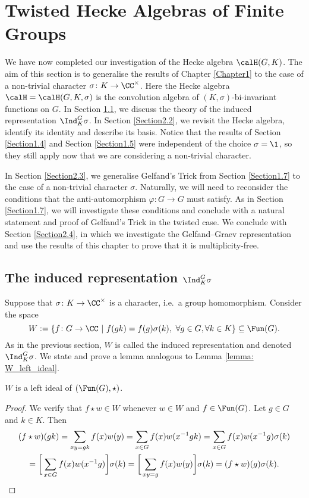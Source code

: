 \section{Twisted Hecke Algebras of Finite Groups}\label{Chapter2}
We have now completed our investigation of the Hecke algebra $\calH(G,K)$.
The aim of this section is to generalise the results of Chapter \ref{Chapter1} to the case of a non-trivial character $\sigma\colon K\to\CC^\times$.
Here the Hecke algebra $\calH=\calH(G,K,\sigma)$ is the convolution algebra of $(K,\sigma)$-bi-invariant functions on $G$.
In Section \ref{Section2.1}, we discuss the theory of the induced representation $\Ind_K^G \sigma$.
In Section \ref{Section2.2}, we revisit the Hecke algebra, identify its identity and describe its basis.
Notice that the results of Section \ref{Section1.4} and Section \ref{Section1.5} were independent of the choice $\sigma=\1$, so they still apply now that we are considering a non-trivial character.

In Section \ref{Section2.3}, we generalise Gelfand's Trick from Section \ref{Section1.7} to the case of a non-trivial character $\sigma$.
Naturally, we will need to reconsider the conditions that the anti-automorphism $\varphi\colon G\to G$ must satisfy.
As in Section \ref{Section1.7}, we will investigate these conditions and conclude with a natural statement and proof of Gelfand's Trick in the twisted case.
We conclude with Section \ref{Section2.4}, in which we investigate the Gelfand--Graev representation and use the results of this chapter to prove that it is multiplicity-free.


\subsection{The induced representation $\Ind_K^G \sigma$}\label{Section2.1}
Suppose that $\sigma\colon K \to\CC^\times$ is a character, i.e.\ a group homomorphism.
Consider the space
\[
	W := \{f\colon G\to \CC\ |\ f(gk) = f(g)\sigma(k),\ \forall g\in G, \forall k \in K\} \subseteq \Fun(G).
\]
As in the previous section, $W$ is called the induced representation and denoted $\Ind_K^G \sigma$.
We state and prove a lemma analogous to Lemma \ref{lemma: W_left_ideal}.
\begin{lem}\label{lemma: W_left_ideal_two}
	$W$ is a left ideal of $(\Fun(G),\star)$.
\end{lem}
\begin{proof}
	We verify that $f\star w\in W$ whenever $w\in W$ and $f\in\Fun(G)$.
	Let $g\in G$ and $k\in K$.
	Then
	\begin{multline*}
		(f\star w)(gk) = \sum_{xy=gk} f(x)w(y) = \sum_{x\in G} f(x)w(x^{-1}gk) = \sum_{x\in G} f(x)w(x^{-1}g)\sigma(k) \\
		= \bigg[\sum_{x\in G} f(x)w(x^{-1}g)\bigg]\sigma(k) = \bigg[\sum_{xy=g} f(x)w(y)\bigg]\sigma(k) = (f\star w)(g)\sigma(k).\qedhere
	\end{multline*}
\end{proof}

